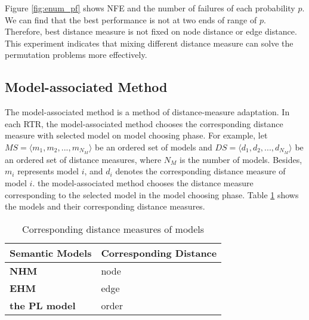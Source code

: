 Figure \ref{fig:enum_pf} shows NFE and the number of failures of each probability $p$. We can find that the best performance is not at two ends of range of $p$. Therefore, best distance measure is not fixed on node distance or edge distance. This experiment indicates that mixing different distance measure can solve the permutation problems more effectively.

\subsection{Model-associated Method}
The model-associated method is a method of distance-measure adaptation. In each RTR, the model-associated method chooses the corresponding distance measure with selected model on model choosing phase. For example, let $MS=\langle m_1 , m_2, ..., m_{N_M}\rangle$ be an ordered set of models and $DS=\langle d_1 , d_2, ..., d_{N_M}\rangle$ be an ordered set of distance measures, where ${N_M}$ is the number of models. Besides, $m_i$ represents model $i$, and $d_i$ denotes the corresponding distance measure of model $i$. the model-associated method chooses the distance measure corresponding to the selected model in the model choosing phase. Table \ref{tb:model_distance} shows the models and their corresponding distance measures.


\begin{table}[htbp]
    \centering
    \begin{tabular}{|l|l|}
    \hline
    \textbf{Semantic Models}       & \textbf{Corresponding Distance}  \\ \hline
    \textbf{NHM} & node     	 \\ \hline
    \textbf{EHM} & edge   	\\ \hline
    \textbf{the PL model} & order   	\\ \hline
  
    \end{tabular} 
    \caption{Corresponding distance measures of models}
    \label{tb:model_distance}
\end{table}

